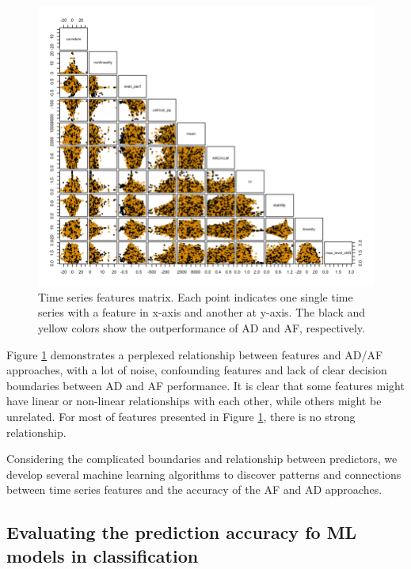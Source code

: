 \documentclass[preprint, 3p,
authoryear]{elsarticle} %
\begin{document}
\begin{figure}[H]

{\centering \includegraphics[width=1\linewidth]{img/300dpi/pair_plot} 

}

\caption{Time series features matrix. Each point indicates one single time series with a feature in x-axis and another at y-axis. The black and yellow colors show the outperformance of AD and AF, respectively.}\label{fig:featuresmatrix}
\end{figure}

Figure \ref{fig:featuresmatrix} demonstrates a perplexed relationship
between features and AD/AF approaches, with a lot of noise, confounding
features and lack of clear decision boundaries between AD and AF
performance. It is clear that some features might have linear or
non-linear relationships with each other, while others might be
unrelated. For most of features presented in Figure
\ref{fig:featuresmatrix}, there is no strong relationship.

Considering the complicated boundaries and relationship between
predictors, we develop several machine learning algorithms to discover
patterns and connections between time series features and the accuracy
of the AF and AD approaches.

\hypertarget{evaluating-the-prediction-accuracy-fo-ml-models-in-classification}{%
\subsection{Evaluating the prediction accuracy fo ML models in
classification}\label{evaluating-the-prediction-accuracy-fo-ml-models-in-classification}}
\end{document}
